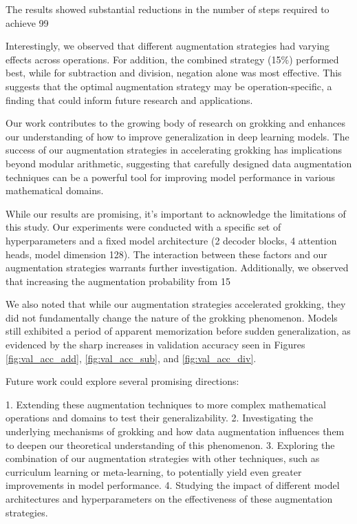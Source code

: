 \documentclass{article} %
\begin{document}
The results showed substantial reductions in the number of steps required to achieve 99%

Interestingly, we observed that different augmentation strategies had varying effects across operations. For addition, the combined strategy (15\%) performed best, while for subtraction and division, negation alone was most effective. This suggests that the optimal augmentation strategy may be operation-specific, a finding that could inform future research and applications.

Our work contributes to the growing body of research on grokking \cite{power2022grokking} and enhances our understanding of how to improve generalization in deep learning models. The success of our augmentation strategies in accelerating grokking has implications beyond modular arithmetic, suggesting that carefully designed data augmentation techniques can be a powerful tool for improving model performance in various mathematical domains.

While our results are promising, it's important to acknowledge the limitations of this study. Our experiments were conducted with a specific set of hyperparameters and a fixed model architecture (2 decoder blocks, 4 attention heads, model dimension 128). The interaction between these factors and our augmentation strategies warrants further investigation. Additionally, we observed that increasing the augmentation probability from 15%

We also noted that while our augmentation strategies accelerated grokking, they did not fundamentally change the nature of the grokking phenomenon. Models still exhibited a period of apparent memorization before sudden generalization, as evidenced by the sharp increases in validation accuracy seen in Figures \ref{fig:val_acc_add}, \ref{fig:val_acc_sub}, and \ref{fig:val_acc_div}.

Future work could explore several promising directions:

1. Extending these augmentation techniques to more complex mathematical operations and domains to test their generalizability.
2. Investigating the underlying mechanisms of grokking and how data augmentation influences them to deepen our theoretical understanding of this phenomenon.
3. Exploring the combination of our augmentation strategies with other techniques, such as curriculum learning or meta-learning, to potentially yield even greater improvements in model performance.
4. Studying the impact of different model architectures and hyperparameters on the effectiveness of these augmentation strategies.
\end{document}
